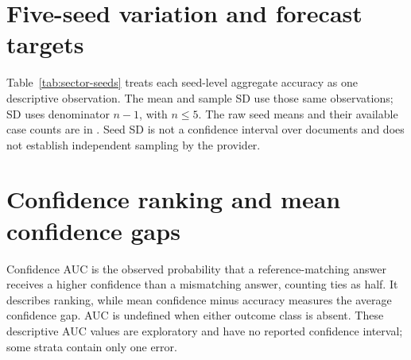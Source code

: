 \clearpage
\section{Five-seed variation and forecast targets}
\label{app:sector-seeds}
Table~\ref{tab:sector-seeds} treats each seed-level aggregate accuracy as one
descriptive observation. The mean and sample SD use those same observations;
SD uses denominator $n-1$, with $n\leq5$. The raw seed means and their available
case counts are in . Seed SD is not a confidence interval
over documents and does not establish independent sampling by the provider.

\begin{table}[htbp]
 \centering\small\setlength{\tabcolsep}{4pt}
 
 \caption{Mean accuracy (sample SD) across the five seed-level aggregate
 rates, in percent and percentage points. Different seeds can have different
 completed-case denominators. Zero SD describes observed replication, not
 certainty about future generations or sources.}
 \label{tab:sector-seeds}
\end{table}

\begin{table}[htbp]
 \centering\small
 \caption{Brier losses for original-correctness forecasts under literal (L)
 and audited (A) grades, and forecasts of actual jury acceptance, pooled over
 conditions. Lower loss is preferable. Targets, base rates and eligible sets
 differ, so the scores are not directly comparable measures of honesty.
 Forecast gap is mean $p_{jury}-p_{original}$ in percentage points.}
 \label{tab:sector-forecasts}
\end{table}

\clearpage
\section{Confidence ranking and mean confidence gaps}
\label{app:confidence-ranking}
Confidence AUC is the observed probability that a reference-matching answer
receives a higher confidence than a mismatching answer, counting ties as half.
It describes ranking, while mean confidence minus accuracy measures the
average confidence gap. AUC is undefined when either outcome class is absent. These
descriptive AUC values are exploratory and have no reported confidence
interval; some strata contain only one error.

\begin{table}[htbp]
 \centering\small\setlength{\tabcolsep}{3pt}
 
 \caption{Initial confidence diagnostics under the audited sensitivity.
 Errors are mismatches over valid outputs. Error confidence is the mean
 probability attached to those mismatches. The gap and its source-group
 bootstrap interval use percentage points. Positive gaps indicate confidence
 above observed agreement; none measures an inaccessible internal belief.}
 \label{tab:confidence-ranking}
\end{table}

